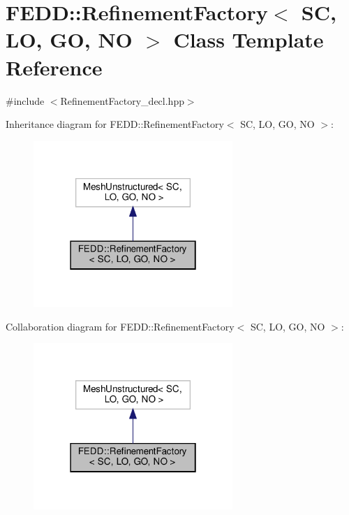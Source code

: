 \hypertarget{classFEDD_1_1RefinementFactory}{}\section{F\+E\+DD\+:\+:Refinement\+Factory$<$ SC, LO, GO, NO $>$ Class Template Reference}
\label{classFEDD_1_1RefinementFactory}


{\ttfamily \#include $<$Refinement\+Factory\+\_\+decl.\+hpp$>$}



Inheritance diagram for F\+E\+DD\+:\+:Refinement\+Factory$<$ SC, LO, GO, NO $>$\+:\nopagebreak
\begin{figure}[H]
\begin{center}
\leavevmode
\includegraphics[width=214pt]{classFEDD_1_1RefinementFactory__inherit__graph}
\end{center}
\end{figure}


Collaboration diagram for F\+E\+DD\+:\+:Refinement\+Factory$<$ SC, LO, GO, NO $>$\+:\nopagebreak
\begin{figure}[H]
\begin{center}
\leavevmode
\includegraphics[width=214pt]{classFEDD_1_1RefinementFactory__coll__graph}
\end{center}
\end{figure}
